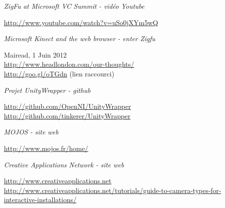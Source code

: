 \begin{thebibliography}{200}
\begin{footnotesize}
  \emph{ZigFu at Microsoft VC Summit - vidéo Youtube}\\
  \begin{tiny}
  \url{http://www.youtube.com/watch?v=uSo0jXYm5wQ}
  \end{tiny}
  
  \emph{Microsoft Kinect and the web browser - enter Zigfu}\\
  \begin{tiny}
  Mairead, 1 Juin 2012\\
  \url{http://www.headlondon.com/our-thoughts/}\\
  \url{http://goo.gl/oTGdn} (lien raccourci)
  \end{tiny}
  
  \emph{Projet UnityWrapper - github}\\
  \begin{tiny}
  \url{http://github.com/OpenNI/UnityWrapper}\\
  \url{http://github.com/tinkerer/UnityWrapper}
  \end{tiny}
  
  \emph{MOJOS - site web}\\
  \begin{tiny}
  \url{http://www.mojos.fr/home/}
  \end{tiny}

  \emph{Creative Applications Network - site web}\\
  \begin{tiny}
  \url{http://www.creativeapplications.net}
  \url{http://www.creativeapplications.net/tutorials/guide-to-camera-types-for-interactive-installations/}
  \end{tiny}
  
\end{footnotesize}
\end{thebibliography}
